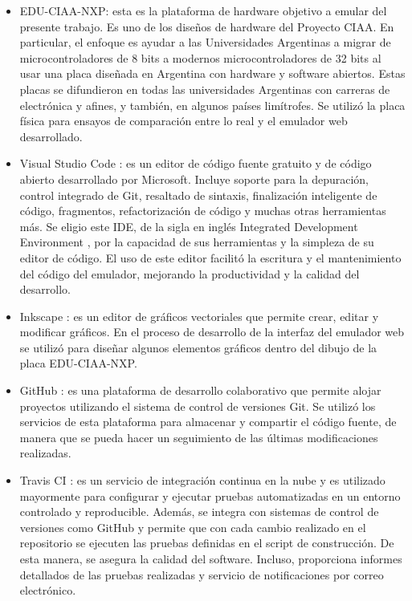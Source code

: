 \begin{itemize}
	\item EDU-CIAA-NXP: esta es la plataforma de hardware objetivo a emular del presente trabajo. Es uno de los diseños de hardware del Proyecto CIAA. En particular, el enfoque es ayudar a las Universidades Argentinas a migrar de microcontroladores de 8 bits a modernos microcontroladores de 32 bits al usar una placa diseñada en Argentina con hardware y software abiertos. Estas placas se difundieron en todas las universidades Argentinas con carreras de electrónica y afines, y también, en algunos países limítrofes. 
Se utilizó la placa física para ensayos de comparación entre lo real y el emulador web desarrollado.

	\item Visual Studio Code \citep{VisualStudioCode}: es un editor de código fuente gratuito y de código abierto desarrollado por Microsoft. Incluye soporte para la depuración, control integrado de Git, resaltado de sintaxis, finalización inteligente de código, fragmentos, refactorización de código y muchas otras herramientas más. Se eligio este IDE, de la sigla en inglés Integrated Development Environment \citep{IDE}, por la capacidad de sus herramientas y la simpleza de su editor de código. El uso de este editor facilitó la escritura y el mantenimiento del código del emulador, mejorando la productividad y la calidad del desarrollo.
	
	\item Inkscape \citep{inkscape}: es un editor de gráficos vectoriales que permite crear, editar y modificar gráficos. En el proceso de desarrollo de la interfaz del emulador web se utilizó para diseñar algunos elementos gráficos dentro del dibujo de la placa EDU-CIAA-NXP.

	\item GitHub \citep{GitHub}: es una plataforma de desarrollo colaborativo que permite alojar proyectos utilizando el sistema de control de versiones Git. Se utilizó los servicios de esta plataforma para almacenar y
compartir el código fuente, de manera que se pueda hacer un seguimiento
de las últimas modificaciones realizadas.
	
	\item Travis CI \citep{TravisCI}: es un servicio de integración continua en la nube y es utilizado mayormente para configurar y ejecutar pruebas automatizadas en un entorno controlado y reproducible. Además, se integra con sistemas de control de versiones como GitHub y permite que con cada cambio realizado en el repositorio se ejecuten las pruebas definidas en el script de construcción.
De esta manera, se asegura la calidad del software. Incluso, proporciona informes detallados de las pruebas realizadas y servicio de notificaciones por correo electrónico.


\end{itemize}
